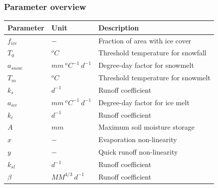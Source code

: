 \subsubsection{Parameter overview}
\begin{table}[htbp]
  \centering
    \begin{tabular}{lll}
    \toprule
    Parameter & Unit  & Description \\
    \midrule
    $f_{ice}$ & $-$   & Fraction of area with ice cover \\
    $T_0$ & $^oC$ & Threshold temperature for snowfall \\
    $a_{snow}$ & $mm~^oC^{-1}~d^{-1}$ & Degree-day factor for snowmelt \\
    $T_m$ & $^oC$ & Threshold temperature for snowmelt \\
    $k_s$ & $d^{-1}$ & Runoff coefficient \\
    $a_{ice}$ & $mm~^oC^{-1}~d^{-1}$ & Degree-day factor for ice melt \\
    $k_i$ & $d^{-1}$ & Runoff coefficient \\
    $A$   & $mm$  & Maximum soil moisture storage \\
    $x$   & $-$   & Evaporation non-linearity \\
    $y$   & $-$   & Quick runoff non-linearity \\
    $k_{sl}$ & $d^{-1}$ & Runoff coefficient \\
    $\beta$ & $MM^{4/3}~d^{-1}$ & Runoff coefficient \\
    \bottomrule
    \end{tabular}%
  \label{tab:addlabel}%
\end{table}%
